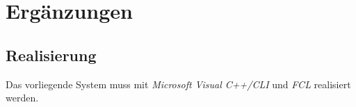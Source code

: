 
\section{Ergänzungen}


\subsection{Realisierung}

Das vorliegende System muss mit \textit{Microsoft Visual C++/CLI} und \textit{FCL} realisiert werden.